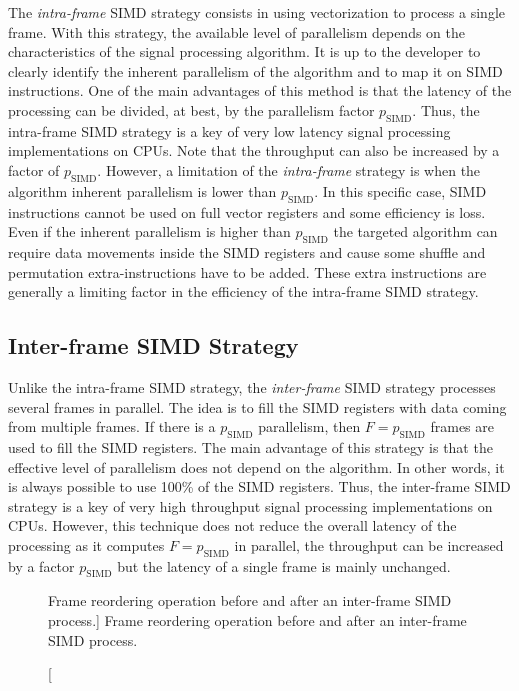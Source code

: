 The \emph{intra-frame} SIMD strategy consists in using vectorization to process
a single frame. With this strategy, the available level of parallelism depends
on the characteristics of the signal processing algorithm. It is up to the
developer to clearly identify the inherent parallelism of the algorithm and to
map it on SIMD instructions. One of the main advantages of this method is that
the latency of the processing can be divided, at best, by the parallelism factor
$p_\text{SIMD}$. Thus, the intra-frame SIMD strategy is a key of very low
latency signal processing implementations on CPUs. Note that the throughput can
also be increased by a factor of $p_\text{SIMD}$. However, a limitation of the
\emph{intra-frame} strategy is when the algorithm inherent parallelism is lower
than $p_\text{SIMD}$. In this specific case, SIMD instructions cannot be used on
full vector registers and some efficiency is loss. Even if the inherent
parallelism is higher than $p_\text{SIMD}$ the targeted algorithm can require
data movements inside the SIMD registers and cause some shuffle and permutation
extra-instructions have to be added. These extra instructions are generally a
limiting factor in the efficiency of the intra-frame SIMD strategy.

\subsection{Inter-frame SIMD Strategy}
\label{sec:opt_vec_inter}

Unlike the intra-frame SIMD strategy, the \emph{inter-frame} SIMD strategy
processes several frames in parallel. The idea is to fill the SIMD registers
with data coming from multiple frames. If there is a $p_\text{SIMD}$
parallelism, then $F = p_\text{SIMD}$ frames are used to fill the SIMD
registers. The main advantage of this strategy is that the effective level of
parallelism does not depend on the algorithm. In other words, it is always
possible to use 100\% of the SIMD registers. Thus, the inter-frame SIMD strategy
is a key of very high throughput signal processing implementations on CPUs.
However, this technique does not reduce the overall latency of the processing as
it computes $F = p_\text{SIMD}$ in parallel, the throughput can be increased by
a factor $p_\text{SIMD}$ but the latency of a single frame is mainly unchanged.

\begin{figure}[htp]
  \centering
  \caption
    [Frame reordering operation before and after an inter-frame SIMD process.]
    {Frame reordering operation before and after an inter-frame SIMD process.}
  \label{fig:opt_vec_inter_frame}
\end{figure}


